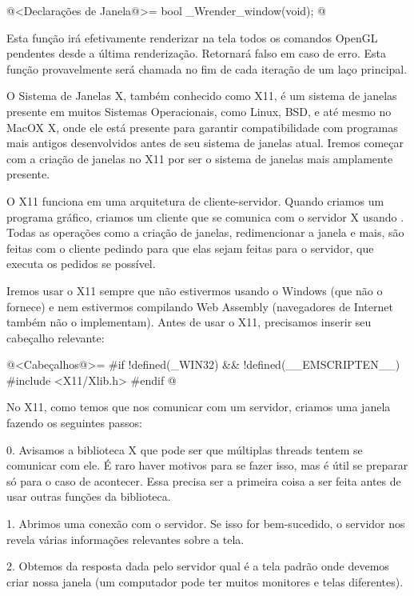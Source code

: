 \iniciocodigo
@<Declarações de Janela@>=
bool _Wrender_window(void);
@
\fimcodigo

Esta função irá efetivamente renderizar na tela todos os comandos
OpenGL pendentes desde a última renderização. Retornará falso em caso
de erro. Esta função provavelmente será chamada no fim de cada
iteração de um laço principal.




O Sistema de Janelas X, também conhecido como X11, é um sistema de
janelas presente em muitos Sistemas Operacionais, como Linux, BSD, e
até mesmo no MacOX X, onde ele está presente para garantir
compatibilidade com programas mais antigos desenvolvidos antes de seu
sistema de janelas atual. Iremos começar com a criação de janelas no
X11 por ser o sistema de janelas mais amplamente presente.

O X11 funciona em uma arquitetura de cliente-servidor. Quando criamos
um programa gráfico, criamos um cliente que se comunica com o servidor
X usando . Todas as operações como a criação de
janelas, redimencionar a janela e mais, são feitas com o cliente
pedindo para que elas sejam feitas para o servidor, que executa os
pedidos se possível.

Iremos usar o X11 sempre que não estivermos usando o Windows (que não
o fornece) e nem estivermos compilando Web Assembly (navegadores de
Internet também não o implementam). Antes de usar o X11, precisamos
inserir seu cabeçalho relevante:

\iniciocodigo
@<Cabeçalhos@>=
#if !defined(_WIN32) && !defined(__EMSCRIPTEN__)
#include <X11/Xlib.h>
#endif
@
\fimcodigo

No X11, como temos que nos comunicar com um servidor, criamos uma
janela fazendo os seguintes passos:

0. Avisamos a biblioteca X que pode ser que múltiplas threads tentem
se comunicar com ele. É raro haver motivos para se fazer isso, mas é
útil se preparar só para o caso de acontecer. Essa precisa ser a
primeira coisa a ser feita antes de usar outras funções da biblioteca.

1. Abrimos uma conexão com o servidor. Se isso for bem-sucedido, o
servidor nos revela várias informações relevantes sobre a tela.

2. Obtemos da resposta dada pelo servidor qual é a tela padrão onde
devemos criar nossa janela (um computador pode ter muitos monitores e
telas diferentes).

